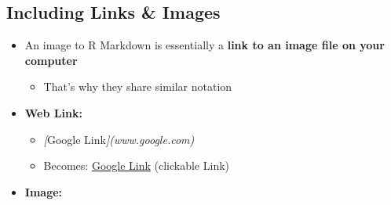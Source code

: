 \documentclass[
]{book}
\newenvironment{Shaded}{\begin{snugshade}}{\end{snugshade}}
\newcommand{\CommentTok}[1]{\textcolor[rgb]{0.56,0.35,0.01}{\textit{#1}}}
\newcommand{\OtherTok}[1]{\textcolor[rgb]{0.56,0.35,0.01}{#1}}
\providecommand{\tightlist}{%
  \setlength{\itemsep}{0pt}\setlength{\parskip}{0pt}}
\begin{document}
\subsection{Including Links \& Images}\label{including-links-images}

\begin{itemize}
\item
  An image to R Markdown is essentially a \textbf{link to an image file on your computer}

  \begin{itemize}
  \tightlist
  \item
    That's why they share similar notation
  \end{itemize}
\item
  \textbf{Web Link:}

  \begin{itemize}
  \item
\begin{Shaded}
\begin{Highlighting}[]
\CommentTok{[}\OtherTok{Google Link}\CommentTok{](www.google.com)}
\end{Highlighting}
\end{Shaded}
  \item
    Becomes: \href{https://www.google.com/}{Google Link} (clickable Link)
  \end{itemize}
\item
  \textbf{Image:}


\end{itemize}
\end{document}
